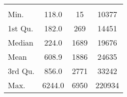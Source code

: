 \begin{tabular}{lS[table-format=5.1]S[table-format=5.1]S[table-format=5.1]}
&  &  &  \\
 Min.    & 118.0 & 15 & 10377 \\
 1st Qu. & 182.0 & 269 & 14451 \\
 Median  & 224.0 & 1689 & 19676 \\
 Mean    & 608.9 & 1886 & 24635 \\
 3rd Qu. & 856.0 & 2771 & 33242 \\
 Max.    & 6244.0 & 6950 & 220934 \\
\end{tabular}
